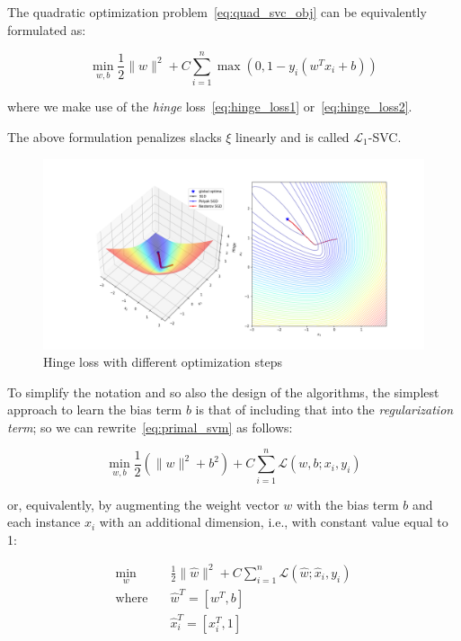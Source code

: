The quadratic optimization problem~\eqref{eq:quad_svc_obj} can be equivalently formulated as:

\begin{equation} \label{eq:primal_l1_svc}
    \min_{w,b} \frac{1}{2} \| w \|^2 + C \sum_{i=1}^n \max(0, 1 - y_i (w^T x_i + b))
\end{equation}

where we make use of the \emph{hinge} loss~\eqref{eq:hinge_loss1} or~\eqref{eq:hinge_loss2}.

The above formulation penalizes slacks $\xi$ linearly and is called $\mathcal{L}_1$-SVC.

\begin{figure}[h!]
	\centering
  	\includegraphics[scale=0.4]{img/l1_svc_loss}
  	\caption{Hinge loss with different optimization steps}
  	\label{fig:l1_svc_loss}
\end{figure}

To simplify the notation and so also the design of the algorithms, the simplest approach to learn the bias term $b$ is that of including that into the \emph{regularization term}; so we can rewrite~\eqref{eq:primal_svm} as follows:

\begin{equation} \label{eq:reg_bias_primal_svm1}
    \min_{w,b} \frac{1}{2} (\| w \|^2 + b^2) + C \sum_{i=1}^n \mathcal{L}(w,b;x_i,y_i)
\end{equation}

or, equivalently, by augmenting the weight vector $w$ with the bias term $b$ and each instance $x_i$ with an additional dimension, i.e., with constant value equal to 1:

\begin{equation} \label{eq:reg_bias_primal_svm2}
    \begin{aligned}
        \min_{w} \quad & \frac{1}{2} \| \hat{w} \|^2 + C \sum_{i=1}^n \mathcal{L}(\hat{w};\hat{x}_i,y_i) \\
            \text{where} \quad & \hat{w}^T = [w^T, b] \\ & \hat{x}_i^T = [x_i^T, 1]
    \end{aligned}
\end{equation}

